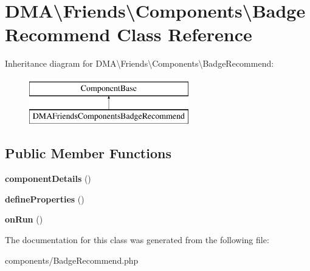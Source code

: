 \hypertarget{classDMA_1_1Friends_1_1Components_1_1BadgeRecommend}{\section{D\-M\-A\textbackslash{}Friends\textbackslash{}Components\textbackslash{}Badge\-Recommend Class Reference}
\label{classDMA_1_1Friends_1_1Components_1_1BadgeRecommend}
}
Inheritance diagram for D\-M\-A\textbackslash{}Friends\textbackslash{}Components\textbackslash{}Badge\-Recommend\-:\begin{figure}[H]
\begin{center}
\leavevmode
\includegraphics[height=2.000000cm]{d2/dbd/classDMA_1_1Friends_1_1Components_1_1BadgeRecommend}
\end{center}
\end{figure}
\subsection*{Public Member Functions}
\begin{DoxyCompactItemize}
\item 
\hypertarget{classDMA_1_1Friends_1_1Components_1_1BadgeRecommend_a851a204784cf3f70c0f3471a37b88a4d}{{\bfseries component\-Details} ()}\label{classDMA_1_1Friends_1_1Components_1_1BadgeRecommend_a851a204784cf3f70c0f3471a37b88a4d}

\item 
\hypertarget{classDMA_1_1Friends_1_1Components_1_1BadgeRecommend_a7678b0bc4e68fd30e61c052562d8df2f}{{\bfseries define\-Properties} ()}\label{classDMA_1_1Friends_1_1Components_1_1BadgeRecommend_a7678b0bc4e68fd30e61c052562d8df2f}

\item 
\hypertarget{classDMA_1_1Friends_1_1Components_1_1BadgeRecommend_acca807fdbef2adc92f6c0a7765ce0dde}{{\bfseries on\-Run} ()}\label{classDMA_1_1Friends_1_1Components_1_1BadgeRecommend_acca807fdbef2adc92f6c0a7765ce0dde}

\end{DoxyCompactItemize}


The documentation for this class was generated from the following file\-:\begin{DoxyCompactItemize}
\item 
components/Badge\-Recommend.\-php\end{DoxyCompactItemize}
